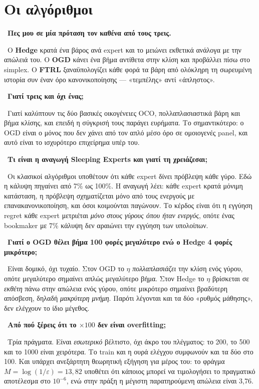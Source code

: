 \documentclass[11pt,a4paper]{article}
\newcommand{\qa}[2]{%
  \par\medskip\noindent{\color{qcol}\textbf{Ε.}}\ \textbf{#1}\par
  \noindent{\color{qcol}\textbf{Α.}}\ #2\par}
\begin{document}
\section{Οι αλγόριθμοι}

\qa{Πες μου σε μία πρόταση τον καθένα από τους τρεις.}
{Ο \textbf{Hedge} κρατά ένα βάρος ανά expert και το μειώνει εκθετικά ανάλογα με την απώλειά
του. Ο \textbf{OGD} κάνει ένα βήμα αντίθετα στην κλίση και προβάλλει πίσω στο simplex. Ο
\textbf{FTRL} ξαναϋπολογίζει κάθε φορά τα βάρη από ολόκληρη τη σωρευμένη ιστορία συν έναν
όρο κανονικοποίησης --- «τεμπέλης» αντί «άπληστος».}

\qa{Γιατί τρεις και όχι ένας;}
{Γιατί καλύπτουν τις δύο βασικές οικογένειες OCO, πολλαπλασιαστικά βάρη και βήμα κλίσης, και
επειδή η σύγκρισή τους παράγει ευρήματα. Το σημαντικότερο: ο OGD είναι ο μόνος που δεν χάνει
από τον απλό μέσο όρο σε ομοιογενές panel, και αυτό είναι το ισχυρότερο επιχείρημα υπέρ του.}

\qa{Τι είναι η αναγωγή Sleeping Experts και γιατί τη χρειάζεσαι;}
{Οι κλασικοί αλγόριθμοι υποθέτουν ότι κάθε expert δίνει πρόβλεψη κάθε γύρο. Εδώ η κάλυψη
πηγαίνει από 7\% ως 100\%. Η αναγωγή λέει: κάθε expert κρατά μόνιμη κατάσταση, η πρόβλεψη
σχηματίζεται μόνο από τους ενεργούς με επανακανονικοποίηση, και όσοι κοιμούνται παγώνουν.
Το κέρδος είναι ότι η εγγύηση regret κάθε expert μετριέται \emph{μόνο στους γύρους όπου ήταν
ενεργός}, οπότε ένας bookmaker με 7\% κάλυψη δεν αραιώνει την εγγύηση των υπολοίπων.}

\qa{Γιατί ο OGD θέλει βήμα 100 φορές μεγαλύτερο ενώ ο Hedge 4 φορές μικρότερο;}
{Είναι δομικό, όχι τυχαίο. Στον OGD το $\eta$ \emph{πολλαπλασιάζει} την κλίση ενός γύρου,
οπότε μεγαλύτερο σημαίνει απλώς μεγαλύτερο βήμα. Στον Hedge το $\eta$ βρίσκεται σε
\emph{εκθέτη} πάνω στην απώλεια ενός γύρου, οπότε μικρότερο σημαίνει βραδύτερη απόσβεση,
δηλαδή \emph{μακρύτερη μνήμη}. Παρότι λέγονται και τα δύο «ρυθμός μάθησης», δεν ελέγχουν το
ίδιο μέγεθος.}

\qa{Από πού ξέρεις ότι το $\times100$ δεν είναι overfitting;}
{Τρία πράγματα. Είναι \emph{εσωτερικό} βέλτιστο, όχι άκρο του πλέγματος: το 200, το 500 και
το 1000 είναι χειρότερα. Το train και η ουρά ελέγχου συμφωνούν και τα δύο στο 100. Και
υπάρχει ανεξάρτητη θεωρητική εξήγηση για μέρος του: το φράγμα $M=\log(1/\varepsilon)=13{,}82$
υποθέτει ότι κάποιος μπορεί να τιμολογήσει το πραγματικό αποτέλεσμα στο $10^{-6}$, ενώ στην
πράξη η μέγιστη παρατηρούμενη απώλεια είναι 3,76.}
\end{document}
